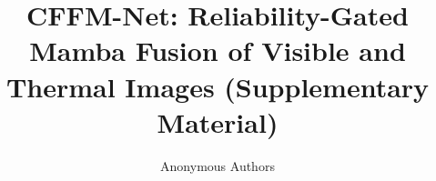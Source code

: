 \documentclass[10pt,twocolumn,letterpaper]{article}
\title{CFFM-Net: Reliability-Gated Mamba Fusion of Visible and Thermal Images (Supplementary Material)}
\author{Anonymous Authors}
\begin{document}
\maketitle



{
  \small
  
  
}
\end{document}
